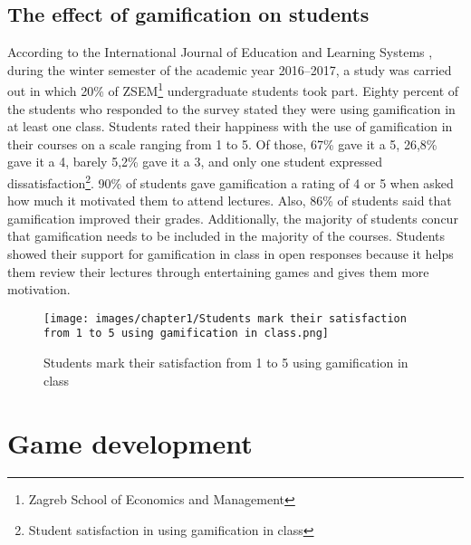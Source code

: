 \documentclass[../main.tex]{subfiles}
\begin{document}
\subsection{The effect of gamification on students}
According to the International Journal of Education and Learning Systems \cite{10}, during the winter semester of the academic year 2016–2017, a study was carried out in which 20\% of ZSEM\footnote{Zagreb School of Economics and Management} undergraduate students took part. Eighty percent of the students who responded to the survey stated they were using gamification in at least one class. Students rated their happiness with the use of gamification in their courses on a scale ranging from 1 to 5. Of those, 67\% gave it a 5, 26,8\% gave it a 4, barely 5,2\% gave it a 3, and only one student expressed dissatisfaction\footnote{Student satisfaction in using gamification in class}.
90\% of students gave gamification a rating of 4 or 5 when asked how much it motivated them to attend lectures. Also, 86\% of students said that gamification improved their grades. Additionally, the majority of students concur that gamification needs to be included in the majority of the courses. Students showed their support for gamification in class in open responses because it helps them review their lectures through entertaining games and gives them more motivation.
\begin{figure}[ht]
\centering
\texttt{[image: images/chapter1/Students mark their satisfaction from 1 to 5 using gamification in class.png]}
\caption{Students mark their satisfaction from 1 to 5 using gamification in class}
\label{fig:Students mark their satisfaction from 1 to 5 using gamification in class}
\end{figure}


\section{Game development}
\end{document}
